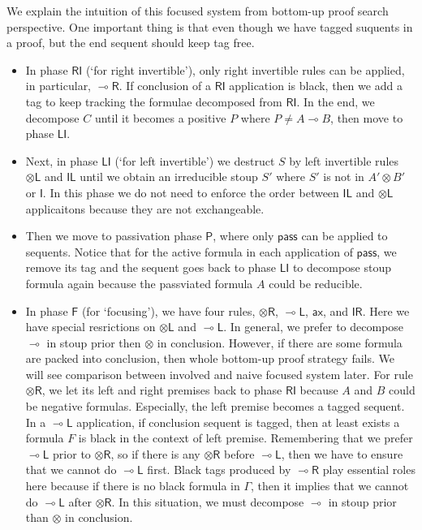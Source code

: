 \documentclass[submission,copyright,creativecommons]{eptcs}
\newcommand{\tl}{\otimes \mathsf{L}}
\newcommand{\tr}{\otimes \mathsf{R}}
\newcommand{\lright}{\multimap \mathsf{R}}
\newcommand{\lleft}{\multimap \mathsf{L}}
\newcommand{\pass}{\mathsf{pass}}
\newcommand{\unitl}{\mathsf{IL}}
\newcommand{\unitr}{\mathsf{IR}}
\newcommand{\ax}{\mathsf{ax}}
\newcommand{\ot}{\otimes}
\newcommand{\lolli}{\multimap}
\newcommand{\I}{\mathsf{I}}
\newcommand{\RI}{\mathsf{RI}}
\newcommand{\LI}{\mathsf{LI}}
\newcommand{\Pass}{\mathsf{P}}
\newcommand{\F}{\mathsf{F}}
\begin{document}
We explain the intuition of this focused system from bottom-up proof search perspective.
One important thing is that even though we have tagged suquents in a proof, but the end sequent should keep tag free.
\begin{itemize}
  \item In phase $\RI$ (`for right invertible'), only right invertible rules can be applied, in particular, $\lright$.
  If conclusion of a $\RI$ application is black, then we add a tag to keep tracking the formulae decomposed from $\RI$.
  In the end, we decompose $C$ until it becomes a positive $P$ where $P \neq A \lolli B$, then move to phase $\LI$.
  \item Next, in phase $\LI$ (`for left invertible') we destruct $S$ by left invertible rules $\tl$ and $\unitl$ until we obtain an irreducible stoup $S'$ where $S'$ is not in $A' \ot B'$ or $\I$.
  In this phase we do not need to enforce the order between $\unitl$ and $\tl$ applicaitons because they are not exchangeable.
  \item Then we move to passivation phase $\Pass$, where only $\pass$ can be applied to sequents.
  Notice that for the active formula in each application of $\pass$, we remove its tag and the sequent goes back to phase $\LI$ to decompose stoup formula again because the passviated formula $A$ could be reducible.
  \item In phase $\F$ (for `focusing'), we have four rules, $\tr$, $\lleft$, $\ax$, and $\unitr$.
  Here we have special resrictions on $\tl$ and $\lleft$.
  In general, we prefer to decompose $\lolli$ in stoup prior then $\ot$ in conclusion.
  However, if there are some formula are packed into conclusion, then whole bottom-up proof strategy fails.
  We will see comparison between involved and naive focused system later.
  For rule $\tr$, we let its left and right premises back to phase $\RI$ because $A$ and $B$ could be negative formulas.
  Especially, the left premise becomes a tagged sequent.
  In a $\lleft$ application, if conclusion sequent is tagged, then at least exists a formula $F$ is black in the context of left premise.
  Remembering that we prefer $\lleft$ prior to $\tr$, so if there is any $\tr$ before $\lleft$, then we have to ensure that we cannot do $\lleft$ first.
  Black tags produced by $\lright$ play essential roles here because if there is no black formula in $\Gamma$, then it implies that we cannot do $\lleft$ after $\tr$.
  In this situation, we must decompose $\lolli$ in stoup prior than $\ot$ in conclusion.
\end{itemize}
\end{document}
